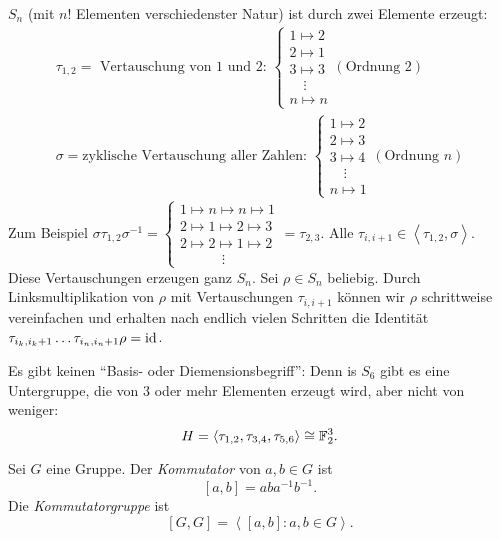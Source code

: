 \begin{eg}
	$S_{n}$ (mit $n!$ Elementen verschiedenster Natur) ist durch zwei Elemente erzeugt:
	\begin{align*}
		\tau_{1,2} = \text{ Vertauschung von $1$ und $2$: } \begin{cases}
			1 \mapsto 2\\ 2 \mapsto 1 \\ 3 \mapsto 3\\ \quad \vdots\\ n \mapsto n
		\end{cases} (\text{Ordnung } 2)\\
		\sigma = \text{zyklische Vertauschung aller Zahlen: } \begin{cases}
			1 \mapsto 2\\ 2 \mapsto 3\\ 3 \mapsto 4 \\ \quad\vdots \\ n\mapsto 1
		\end{cases} (\text{Ordnung } n)
	\end{align*}
	Zum Beispiel $\sigma \tau_{1,2} \sigma^{-1} = \begin{cases}
		1 \mapsto n \mapsto  n \mapsto  1\\
		2  \mapsto 1 \mapsto 2 \mapsto 3\\
		2 \mapsto 2 \mapsto 1 \mapsto 2\\
		\qquad\quad\vdots
	\end{cases} = \tau_{2,3}$. Alle $\tau_{i,i+1} \in \left< \tau_{1,2}, \sigma \right>$.
	Diese Vertauschungen erzeugen ganz $S_{n}$.
	Sei $\rho \in S_{n}$ beliebig. Durch Linksmultiplikation von $\rho$ mit Vertauschungen $\tau_{i,i+1}$ können wir $\rho$ schrittweise vereinfachen
	und erhalten nach endlich vielen Schritten die Identität $\tau_{i_{k},i_{k}+1} \ldots \tau_{i_{n}, i_{n} + 1} \rho = \operatorname{id}$.
\end{eg}

\begin{remark}
	Es gibt keinen \enquote{Basis- oder Diemensionsbegriff}:
	Denn is $S_{6}$ gibt es eine Untergruppe, die von $3$ oder mehr Elementen erzeugt wird, aber nicht von weniger:
	\[
	H = \left< \tau_{1,2}, \tau_{3,4}, \tau_{5,6} \right> \cong \mathbb{F}_{2}^{3}
	.\] 
\end{remark}

\begin{definition}
	Sei $G$ eine Gruppe. Der \emph{Kommutator} von $a,b \in G$ ist 
	\[
		[a,b] = ab a^{-1} b^{-1}
	.\]
	Die \emph{Kommutatorgruppe} ist
	\[
		[G,G] = \left< [a,b]: a,b \in G \right>
	.\] 
\end{definition}

